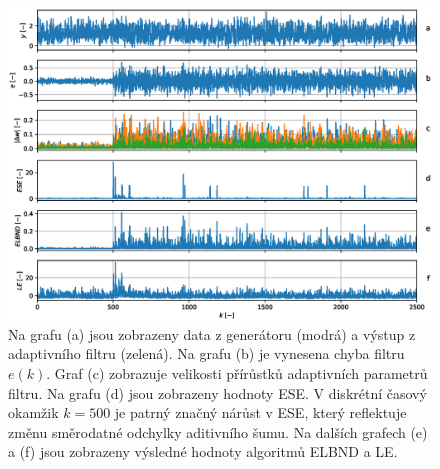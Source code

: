 \begin{figure}[ht!] 
    \centering
    \includegraphics[scale=0.60]{IMG/mdpi/noise_change.eps}
    \caption{Na grafu (a) jsou zobrazeny data z generátoru (modrá) a výstup z adaptivního filtru (zelená). Na grafu (b) je vynesena chyba filtru $e(k)$. Graf (c) zobrazuje velikosti přírůstků adaptivních parametrů filtru. Na grafu (d) jsou zobrazeny hodnoty ESE. V diskrétní časový okamžik $k=500$ je patrný značný nárůst v ESE, který reflektuje změnu směrodatné odchylky aditivního šumu. Na dalších grafech (e) a (f) jsou zobrazeny výsledné hodnoty algoritmů ELBND a LE.}
    \label{fig:noise_changed}
\end{figure}


